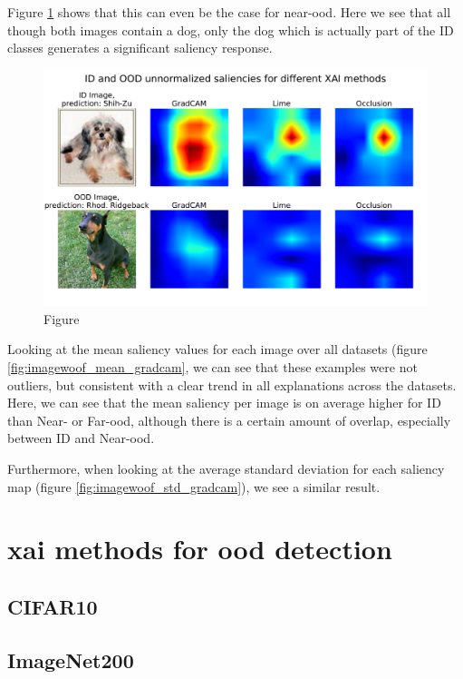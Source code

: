 \documentclass[UKenglish]{uiomasterthesis} %
\theoremstyle{definition}
\begin{document}
Figure \ref{fig:imagewoof_unnorm_stan} shows that this can even be the case for near-\ac{ood}. Here we see that all though both images contain a dog, only the dog which is actually part of the ID classes generates a significant saliency response.

\begin{figure}[ht]
\centerline{\includegraphics[width=6.25in]{figure/imagewoof_unnormalized_sal_stanford.pdf}}
\caption{Figure}
\label{fig:imagewoof_unnorm_stan}
\end{figure}

Looking at the mean saliency values for each image over all datasets (figure \ref{fig:imagewoof_mean_gradcam}, we can see that these examples were not outliers, but consistent with a clear trend in all explanations across the datasets. Here, we can see that the mean saliency per image is on average higher for ID than Near- or Far-\ac{ood}, although there is a certain amount of overlap, especially between ID and Near-\ac{ood}.

Furthermore, when looking at the average standard deviation for each saliency map (figure \ref{fig:imagewoof_std_gradcam}), we see a similar result.


\section{\ac{xai} methods for \ac{ood} detection}

\subsection{CIFAR10}

\subsection{ImageNet200}
\end{document}
